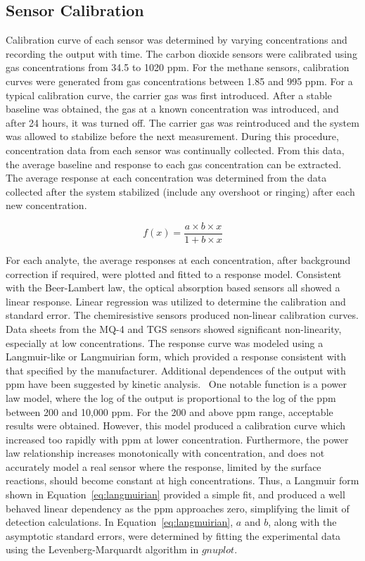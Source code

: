 \documentclass[times]{joehreview}
\begin{document}
	\subsection*{Sensor Calibration}
	\label{sec:method_cal}
	Calibration curve of each sensor was determined by varying concentrations and recording the output with time.  The carbon dioxide sensors were calibrated using gas concentrations from 34.5 to 1020 ppm.  For the methane sensors, calibration curves were generated from gas concentrations between 1.85 and 995 ppm.   For a typical calibration curve, the carrier gas was first introduced.  After a stable baseline was obtained, the gas at a known concentration was introduced, and after 24 hours, it was turned off. The carrier gas was reintroduced and the system was allowed to stabilize before the next measurement. During this procedure, concentration data from each sensor was continually collected. From this data, the average baseline and response to each gas concentration can be extracted.  The average response at each concentration was determined from the data collected after the system stabilized (include any overshoot or ringing) after each new concentration.
	
	\begin{equation}
	\label{eq:langmuirian}
	f(x)=\frac{a\times b\times x}{1+b\times x}
	\end{equation}
	
	For each analyte, the average responses at each concentration, after background correction if required, were plotted and fitted to a response model.  Consistent with the Beer-Lambert law, the optical absorption based sensors all showed a linear response.  Linear regression was utilized to determine the calibration and standard error.  The chemiresistive sensors produced non-linear calibration curves.  Data sheets from the MQ-4 and TGS sensors showed significant non-linearity, especially at low concentrations.  The response curve was modeled using a Langmuir-like or Langmuirian form, which provided a response consistent with that specified by the manufacturer.  Additional dependences of the output with ppm have been suggested by kinetic analysis.~\cite{barsan_fundamental_1999,ahlers_rate_2005}  One notable function is a power law model, where the log of the output is proportional to the log of the ppm between 200 and 10,000 ppm.  For the 200 and above ppm range, acceptable results were obtained.  However, this model produced a calibration curve which increased too rapidly with ppm at lower concentration.  Furthermore, the power law relationship increases monotonically with concentration, and does not accurately model a real sensor where the response, limited by the surface reactions, should become constant at high concentrations.  Thus, a Langmuir form shown in Equation~\ref{eq:langmuirian} provided a simple fit, and produced a well behaved linear dependency as the ppm approaches zero, simplifying the limit of detection calculations.  In Equation~\ref{eq:langmuirian}, $a$ and $b$, along with the asymptotic standard errors, were determined by fitting the experimental data using the Levenberg-Marquardt algorithm in $gnuplot$.~\cite{williams_gnuplot_2016}
	
\end{document}
